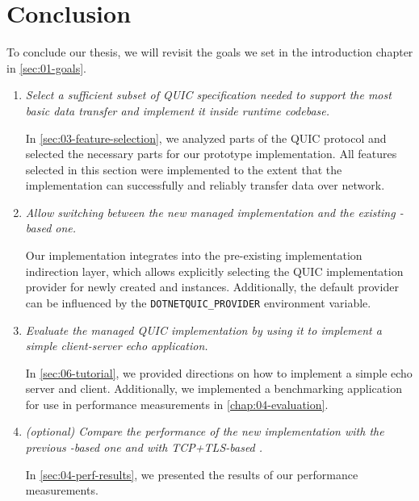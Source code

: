 \chapter*{Conclusion}

To conclude our thesis, we will revisit the goals we set in the introduction chapter in
\autoref{sec:01-goals}.

\begin{enumerate}

  \item \textit{Select a sufficient subset of QUIC specification needed to support the most basic data
        transfer and implement it inside \dotnet{} runtime codebase.}

        In \autoref{sec:03-feature-selection}, we analyzed parts of the QUIC protocol and selected
        the necessary parts for our prototype implementation. All features selected in this section
        were implemented to the extent that the implementation can successfully and reliably
        transfer data over network.

  \item \textit{Allow switching between the new managed implementation and the existing \libmsquic{}-based one.}

        Our implementation integrates into the pre-existing implementation indirection layer, which
        allows explicitly selecting the QUIC implementation provider for newly created
        \QuicListener{} and \QuicConnection{} instances. Additionally, the default provider can be
        influenced by the \texttt{DOTNETQUIC_PROVIDER} environment variable.

  \item \textit{Evaluate the managed QUIC implementation by using it to implement a simple client-server
echo application.}

        In \autoref{sec:06-tutorial}, we provided directions on how to implement a simple echo
        server and client. Additionally, we implemented a benchmarking application for use in
        performance measurements in \autoref{chap:04-evaluation}.

  \item \textit{(optional) Compare the performance of the new implementation with the
previous \libmsquic{}-based one and with TCP+TLS-based .}

       In \autoref{sec:04-perf-results}, we presented the results of our performance measurements.


\end{enumerate}

